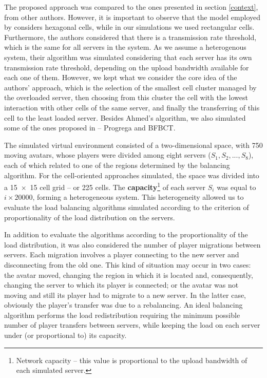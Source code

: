 \documentclass[acmjacm]{acmtrans2m}
\begin{document}
The proposed approach was compared to the ones presented in section \ref{context}, from other authors. However, it is important to observe that the model employed by \cite{ahmed2008mol} considers hexagonal cells, while in our simulations we used rectangular cells. Furthermore, the authors considered that there is a transmission rate threshold, which is the same for all servers in the system. As we assume a heterogenous system, their algorithm was simulated considering that each server has its own transmission rate threshold, depending on the upload bandwidth available for each one of them. However, we kept what we consider the core idea of the authors' approach, which is the selection of the smallest cell cluster managed by the overloaded server, then choosing from this cluster the cell with the lowest interaction with other cells of the same server, and finally the transferring of this cell to the least loaded server. Besides Ahmed's algorithm, we also simulated some of the ones proposed in \cite{bezerra2009lbs} -- Progrega and BFBCT.

The simulated virtual environment consisted of a two-dimensional space, with 750 moving avatars, whose players were divided among eight servers ($S_1, S_2, ..., S_8$), each of which related to one of the regions determined by the balancing algorithm. For the cell-oriented approaches simulated, the space was divided into a \mbox{15 $\times$ 15} cell grid -- or 225 cells. The \textbf{capacity}\footnote{Network capacity -- this value is proportional to the upload bandwidth of each simulated server.} of each server $S_i$ was equal to $i \times 20000$, forming a heterogeneous system. This heterogeneity allowed us to evaluate the load balancing algorithms simulated according to the criterion of proportionality of the load distribution on the servers.

In addition to evaluate the algorithms according to the proportionality of the load distribution, it was also considered the number of player migrations between servers. Each migration involves a player connecting to the new server and disconnecting from the old one. This kind of situation may occur in two cases: the avatar moved, changing the region in which it is located and, consequently, changing the server to which its player is connected; or the avatar was not moving and still its player had to migrate to a new server. In the latter case, obviously the player's transfer was due to a rebalancing. An ideal balancing algorithm performs the load redistribution requiring the minimum possible number of player transfers between servers, while keeping the load on each server under (or proportional to) its capacity.
\end{document}

